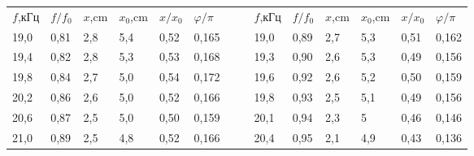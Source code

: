 \documentclass{article}
\begin{document}
 \begin{center}
    \begin{tabular}{|l|l|l|l|l|l|llllllll}
    \cline{1-6} \cline{9-14}
    \multicolumn{1}{|c|}{$f$,кГц} & \multicolumn{1}{c|}{$f/f_0$} & $x$,cm & $x_0$,cm & $x/x_0 $ & $\varphi/\pi$ &  & \multicolumn{1}{c|}{} & \multicolumn{1}{c|}{$f$,кГц} & \multicolumn{1}{c|}{$f/f_0$} & \multicolumn{1}{l|}{$x$,cm} & \multicolumn{1}{l|}{$x_0$,cm} & \multicolumn{1}{l|}{$x/x_0 $} & \multicolumn{1}{l|}{$\varphi/\pi$} \\ \cline{1-6} \cline{9-14} 
    19,0                          & 0,81                         & 2,8    & 5,4      & 0,52     & 0,165        &  & \multicolumn{1}{l|}{} & \multicolumn{1}{l|}{19,0}    & \multicolumn{1}{l|}{0,89}    & \multicolumn{1}{l|}{2,7}    & \multicolumn{1}{l|}{5,3}      & \multicolumn{1}{l|}{0,51}     & \multicolumn{1}{l|}{0,162}        \\ \cline{1-6} \cline{9-14} 
    19,4                          & 0,82                         & 2,8    & 5,3      & 0,53     & 0,168        &  & \multicolumn{1}{l|}{} & \multicolumn{1}{l|}{19,3}    & \multicolumn{1}{l|}{0,90}    & \multicolumn{1}{l|}{2,6}    & \multicolumn{1}{l|}{5,3}      & \multicolumn{1}{l|}{0,49}     & \multicolumn{1}{l|}{0,156}        \\ \cline{1-6} \cline{9-14} 
    19,8                          & 0,84                         & 2,7    & 5,0      & 0,54     & 0,172        &  & \multicolumn{1}{l|}{} & \multicolumn{1}{l|}{19,6}    & \multicolumn{1}{l|}{0,92}    & \multicolumn{1}{l|}{2,6}    & \multicolumn{1}{l|}{5,2}      & \multicolumn{1}{l|}{0,50}     & \multicolumn{1}{l|}{0,159}        \\ \cline{1-6} \cline{9-14} 
    20,2                          & 0,86                         & 2,6    & 5,0      & 0,52     & 0,166        &  & \multicolumn{1}{l|}{} & \multicolumn{1}{l|}{19,8}    & \multicolumn{1}{l|}{0,93}    & \multicolumn{1}{l|}{2,5}    & \multicolumn{1}{l|}{5,1}      & \multicolumn{1}{l|}{0,49}     & \multicolumn{1}{l|}{0,156}        \\ \cline{1-6} \cline{9-14} 
    20,6                          & 0,87                         & 2,5    & 5,0      & 0,50     & 0,159        &  & \multicolumn{1}{l|}{} & \multicolumn{1}{l|}{20,1}    & \multicolumn{1}{l|}{0,94}    & \multicolumn{1}{l|}{2,3}    & \multicolumn{1}{l|}{5}        & \multicolumn{1}{l|}{0,46}     & \multicolumn{1}{l|}{0,146}        \\ \cline{1-6} \cline{9-14} 
    21,0                          & 0,89                         & 2,5    & 4,8      & 0,52     & 0,166        &  & \multicolumn{1}{l|}{} & \multicolumn{1}{l|}{20,4}    & \multicolumn{1}{l|}{0,95}    & \multicolumn{1}{l|}{2,1}    & \multicolumn{1}{l|}{4,9}      & \multicolumn{1}{l|}{0,43}     & \multicolumn{1}{l|}{0,136}        \\ \cline{1-6} \cline{9-14} 

\end{tabular}
\end{center}
\end{document}
